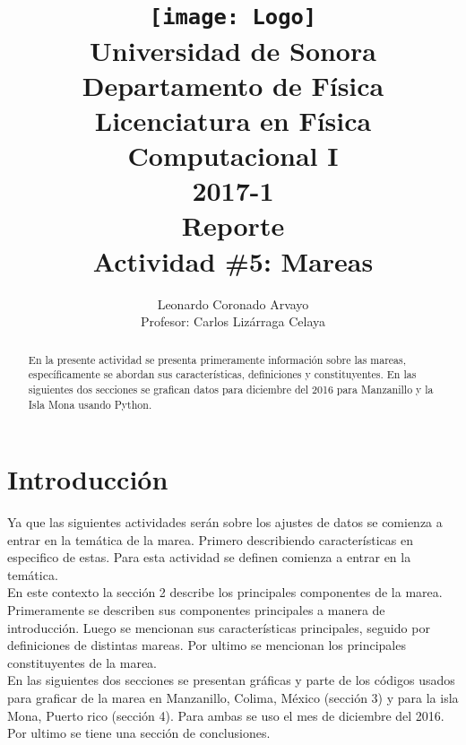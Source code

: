 \documentclass[12pt,letterpaper]{article}
\author{
Leonardo Coronado Arvayo\\
Profesor: Carlos Lizárraga Celaya   \vspace*{1.25in}}
\title{	\texttt{[image: Logo]} \\
Universidad de Sonora \\
{\small Departamento de Física \\
Licenciatura en Física \\
Computacional I \\
2017-1 \\
\vspace{0.55in} Reporte}\\ 
{\Huge Actividad \#5: Mareas}\\
\vspace*{1.0in}}
\begin{document}
	\maketitle
\newpage
	\tableofcontents
\pagebreak

\begin{abstract}


En la presente actividad se presenta primeramente información sobre las mareas, específicamente se abordan sus características, definiciones y constituyentes. En las siguientes dos secciones se grafican datos para diciembre del 2016 para Manzanillo y la Isla Mona usando Python.


\end{abstract}


\section{Introducción}

Ya que las siguientes actividades serán sobre los ajustes de datos se comienza a entrar en la temática de la marea. Primero describiendo características en especifico de estas. Para esta actividad se definen comienza a entrar en la temática.\\

En este contexto la sección 2 describe los principales componentes de la marea. Primeramente se describen sus componentes principales a manera de introducción. Luego se mencionan sus características principales, seguido por definiciones de distintas mareas. Por ultimo se mencionan los principales constituyentes de la marea.\\

En las siguientes dos secciones se presentan gráficas y parte de los códigos usados para graficar de la marea en Manzanillo, Colima, México (sección 3) y para la isla Mona, Puerto rico (sección 4). Para ambas se uso el mes de diciembre del 2016.\\
Por ultimo se tiene una sección de conclusiones.\\
\end{document}
